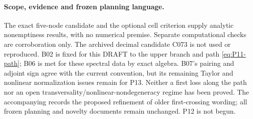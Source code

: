 \paragraph{Scope, evidence and frozen planning language.}
The exact five-node candidate and the optional cell criterion supply
analytic nonemptiness results, with no numerical premise. Separate
computational checks are corroboration only. The archived decimal
candidate C073 is not used or reproduced. B02 is fixed for this DRAFT
to the upper branch and path \eqref{eq:P11-path}; B06 is met for these
spectral data by exact algebra. B07's pairing and adjoint sign agree
with the current convention, but its remaining Taylor and nonlinear
normalization issues remain for P13. Neither a first loss along the
path nor an open transversality/nonlinear-nondegeneracy regime has been
proved. The accompanying 
records the proposed refinement of older first-crossing wording; all
frozen planning and novelty documents remain unchanged. P12 is not begun.
